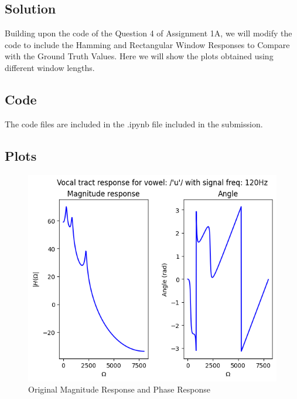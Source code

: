 \documentclass{article}
\begin{document}
\subsection{Solution}
Building upon the code of the Question 4 of Assignment 1A, we will modify the code to include the Hamming and Rectangular Window Responses to Compare with the Ground Truth Values. Here we will show the plots obtained using different window lengths.

\subsection{Code}
The code files are included in the .ipynb file included in the submission.

\subsection{Plots}

\begin{figure}[H]
\centering
\includegraphics[scale = 0.5]{Q4_C1.png}
\caption{Original Magnitude Response and Phase Response}
\end{figure}
\newpage
\end{document}
